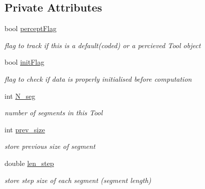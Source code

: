 \subsection*{Private Attributes}
\begin{DoxyCompactItemize}
\item 
\mbox{\label{classCreate__Tool_a2da4141fdf279a34ec7642e02e81ae6f}} 
bool \hyperlink{classCreate__Tool_a2da4141fdf279a34ec7642e02e81ae6f}{percept\+Flag}
\begin{DoxyCompactList}\small\item\em flag to track if this is a default(coded) or a percieved \textquotesingle{}Tool\textquotesingle{} object \end{DoxyCompactList}\item 
\mbox{\label{classCreate__Tool_a8751f23989211bc27690cba3aa369e0d}} 
bool \hyperlink{classCreate__Tool_a8751f23989211bc27690cba3aa369e0d}{init\+Flag}
\begin{DoxyCompactList}\small\item\em flag to check if data is properly initialised before computation \end{DoxyCompactList}\item 
\mbox{\label{classCreate__Tool_a8d6fff2315a7198c8a59e7c0c48401bd}} 
int \hyperlink{classCreate__Tool_a8d6fff2315a7198c8a59e7c0c48401bd}{N\+\_\+seg}
\begin{DoxyCompactList}\small\item\em number of segments in this \textquotesingle{}Tool\textquotesingle{} \end{DoxyCompactList}\item 
\mbox{\label{classCreate__Tool_aa7dcad369b209d4ee5352e7617762ecf}} 
int \hyperlink{classCreate__Tool_aa7dcad369b209d4ee5352e7617762ecf}{prev\+\_\+size}
\begin{DoxyCompactList}\small\item\em store previous size of segment \end{DoxyCompactList}\item 
\mbox{\label{classCreate__Tool_a29cf141ff3ce17edd908185bbdb10e8d}} 
double \hyperlink{classCreate__Tool_a29cf141ff3ce17edd908185bbdb10e8d}{len\+\_\+step}
\begin{DoxyCompactList}\small\item\em store step size of each segment (segment length) \end{DoxyCompactList}\item 

\end{DoxyCompactItemize}
